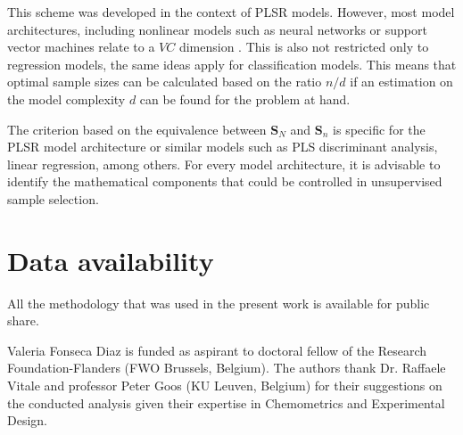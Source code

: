 \documentclass[journal=ancham,manuscript=article]{achemso}
\begin{document}
This scheme was developed in the context of PLSR models. However, most model architectures, including nonlinear models such as neural networks or support vector machines relate to a $VC$ dimension \cite{Vapnik2019}. This is also not restricted only to regression models, the same ideas apply for classification models. This means that optimal sample sizes can be calculated based on the ratio $n/d$ if an estimation on the model complexity $d$ can be found for the problem at hand. 

The criterion based on the equivalence between $\mathbf{S}_N$ and $\mathbf{S}_n$ is specific for the PLSR model architecture or similar models such as PLS discriminant analysis, linear regression, among others. For every model architecture, it is advisable to identify the mathematical components that could be controlled in unsupervised sample selection.  





\section{Data availability}

All the methodology that was used in the present work is available for public share. 


\begin{acknowledgement}

Valeria Fonseca Diaz is funded as aspirant to doctoral fellow of
the Research Foundation-Flanders (FWO Brussels, Belgium).
The authors thank Dr. Raffaele Vitale and professor Peter Goos (KU Leuven, Belgium) for their suggestions on the conducted analysis given their expertise in Chemometrics and Experimental Design. 
\end{acknowledgement}





\end{document}
